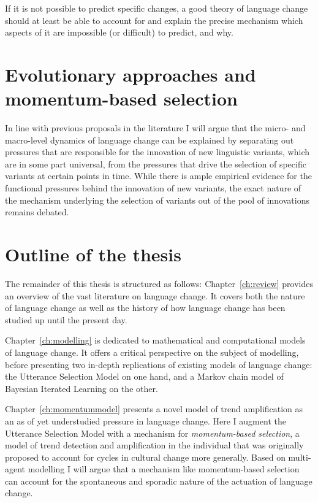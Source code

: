 
If it is not possible to predict specific changes, a good theory of language change should at least be able to account for and explain the precise mechanism which aspects of it are impossible (or difficult) to predict, and why.

\section{Evolutionary approaches and momentum-based selection}

In line with previous proposals in the literature I will argue that the micro- and macro-level dynamics of language change can be explained by separating out pressures that are responsible for the innovation of new linguistic variants, which are in some part universal, from the pressures that drive the selection of specific variants at certain points in time.
While there is ample empirical evidence for the functional pressures behind the innovation of new variants, the exact nature of the mechanism underlying the selection of variants out of the pool of innovations remains debated.

\section{Outline of the thesis}

The remainder of this thesis is structured as follows: Chapter~\ref{ch:review} provides an overview of the vast literature on language change. It covers both the nature of language change as well as the history of how language change has been studied up until the present day. %

Chapter~\ref{ch:modelling} is dedicated to mathematical and computational models of language change. It offers a critical perspective on the subject of modelling, before presenting two in-depth replications of existing models of language change: the Utterance Selection Model on one hand, and a Markov chain model of Bayesian Iterated Learning on the other.

Chapter~\ref{ch:momentummodel} presents a novel model of trend amplification as an as of yet understudied pressure in language change. Here I augment the Utterance Selection Model with a mechanism for \emph{momentum-based selection}, a model of trend detection and amplification in the individual that was originally proposed to account for cycles in cultural change more generally. Based on multi-agent modelling I will argue that a mechanism like momentum-based selection can account for the spontaneous and sporadic nature of the actuation of language change.


